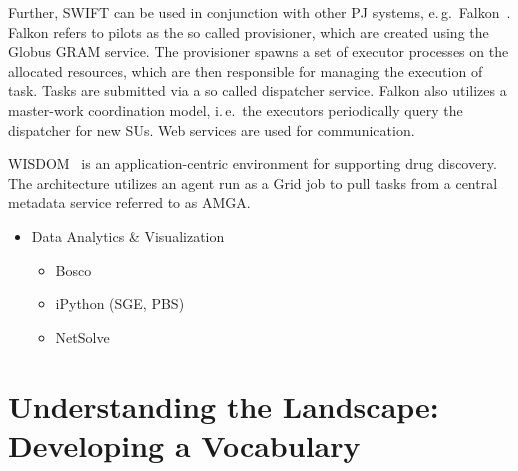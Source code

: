 \documentclass{sig-alternate}
\begin{document}
Further, SWIFT can be used in conjunction with other PJ systems,
e.\,g.\ Falkon~\cite{1362680}. Falkon refers to pilots as the so
called provisioner, which are created using the Globus GRAM
service. The provisioner spawns a set of executor processes on the
allocated resources, which are then responsible for managing the
execution of task. Tasks are submitted via a so called dispatcher
service. Falkon also utilizes a master-work coordination model,
i.\,e.\ the executors periodically query the dispatcher for new SUs.
Web services are used for communication.




WISDOM~\cite{Ahn:2008:ITR:1444448.1445115,wisdom} is an application-centric
environment for supporting drug discovery. The architecture utilizes an agent
run as a Grid job to pull tasks from a central metadata service referred to as
AMGA.



\begin{itemize}
	\item Data Analytics \& Visualization
	\begin{itemize}
		\item Bosco
		\item iPython (SGE, PBS)
		\item NetSolve~\cite{Casanova:1995:NNS:898848}
	\end{itemize}		
\end{itemize}






\section{Understanding the Landscape: Developing a Vocabulary}
\label{sec:vocab}
\end{document}
